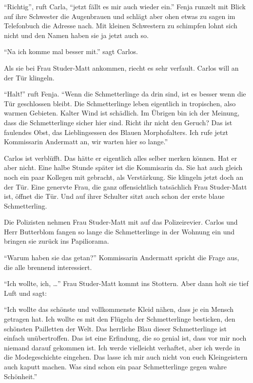\enquote{Richtig}, ruft Carla, \enquote{jetzt fällt es mir auch wieder ein.} Fenja runzelt mit Blick auf ihre Schwester die Augenbrauen und schlägt aber ohen etwas zu sagen im Telefonbuch die Adresse nach. Mit kleinen Schwestern zu schimpfen lohnt sich nicht und den Namen haben sie ja jetzt auch so.

\enquote{Na ich komme mal besser mit.} sagt Carlos.

Als sie bei Frau Studer-Matt ankommen, riecht es sehr verfault. Carlos will an der Tür klingeln.

\enquote{Halt!} ruft Fenja. \enquote{Wenn die Schmetterlinge da drin sind, ist es besser wenn die Tür geschlossen bleibt. Die Schmetterlinge leben eigentlich in tropischen, also warmen Gebieten. Kalter Wind ist schädlich. Im Übrigen bin ich der Meinung, dass die Schmetterlinge sicher hier sind. Richt ihr nicht den Geruch? Das ist faulendes Obst, das Lieblingsessen des Blauen Morphofalters. Ich rufe jetzt Kommissarin Andermatt an, wir warten hier so lange.}

Carlos ist verblüfft. Das hätte er eigentlich alles selber merken können. Hat er aber nicht. Eine halbe Stunde später ist die Kommisarin da. Sie hat auch gleich noch ein paar Kollegen mit gebracht, als Verstärkung. Sie klingeln jetzt doch an der Tür. Eine genervte Frau, die ganz offensichtlich tatsächlich Frau Studer-Matt ist, öffnet die Tür. Und auf ihrer Schulter sitzt auch schon der erste blaue Schmetterling.
\begin{center}
\aldineleft
\end{center}

Die Polizisten nehmen Frau Studer-Matt mit auf das Polizeirevier. Carlos und Herr Butterblom fangen so lange die Schmetterlinge in der Wohnung ein und bringen sie zurück ins Papiliorama. 

\enquote{Warum haben sie das getan?} Kommissarin Andermatt spricht die Frage aus, die alle brennend interessiert.

\enquote{Ich wollte, ich, \dots} Frau Studer-Matt kommt ins Stottern. Aber dann holt sie tief Luft und sagt: 

\enquote{Ich wollte das schönste und vollkommenste Kleid nähen, dass je ein Mensch getragen hat. Ich wollte es mit den Flügeln der Schmetterlinge besticken, den schönsten Pailletten der Welt. Das herrliche Blau dieser Schmetterlinge ist einfach unübertroffen. Das ist eine Erfindung, die so genial ist, dass vor mir noch niemand darauf gekommen ist. Ich werde vielleicht verhaftet, aber ich werde in die Modegeschichte eingehen. Das lasse ich mir auch nicht von euch Kleingeistern auch kaputt machen. Was sind schon ein paar Schmetterlinge gegen wahre Schönheit.}

